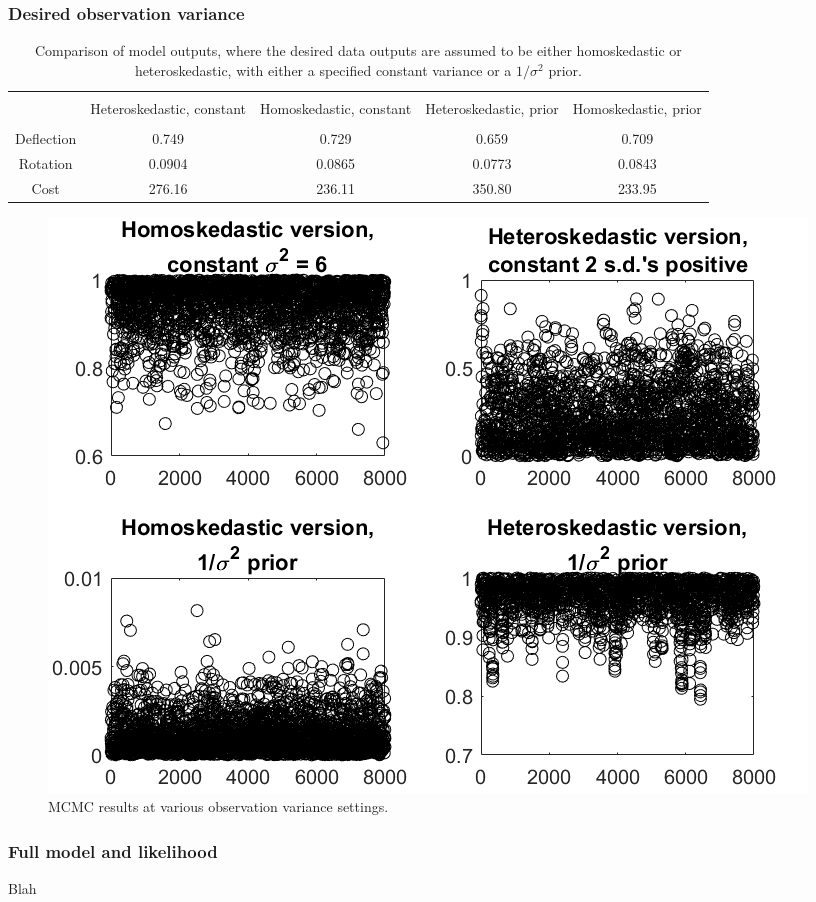 \documentclass{article}
\begin{document}
\subsubsection{Desired observation variance}
\begin{table}[h]
\centering
\begin{tabular}{| c | c  |  c  | c |  c  |}
\hline
 \vspace{-3mm}
& & & & \\
& \parbox{24mm}{\centering Heteroskedastic, constant}& \parbox{24mm}{\centering Homoskedastic, constant}& \parbox{24mm}{\centering Heteroskedastic, prior} & \parbox{24mm}{\centering Homoskedastic, prior}\\
 \vspace{-3.5mm}
& & & & \\
\hline
Deflection & 0.749 & 0.729 & 0.659 & 0.709\\
Rotation & 0.0904 & 0.0865 & 0.0773 & 0.0843\\
Cost & 276.16 & 236.11 & 350.80 & 233.95 \\
\hline
\end{tabular}
\caption{Comparison of model outputs, where the desired data outputs are assumed to be either homoskedastic or heteroskedastic, with either a specified constant variance or a $1/\sigma^2$ prior.}
\label{table:obs_var_comp}
\end{table}

\begin{figure}
\centering
\includegraphics[width=.65\linewidth]{comp_obs_var}
\caption{MCMC results at various observation variance settings.}
\label{fig:comp_obs_var}
\end{figure}

\subsubsection{Full model and likelihood}
Blah
\end{document}
